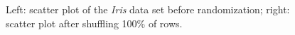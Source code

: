 \begin{figure}[h]
    \caption{Left: scatter plot of the \textit{Iris} data set before randomization; right: scatter plot after shuffling 100\% of rows.}
\end{figure}

